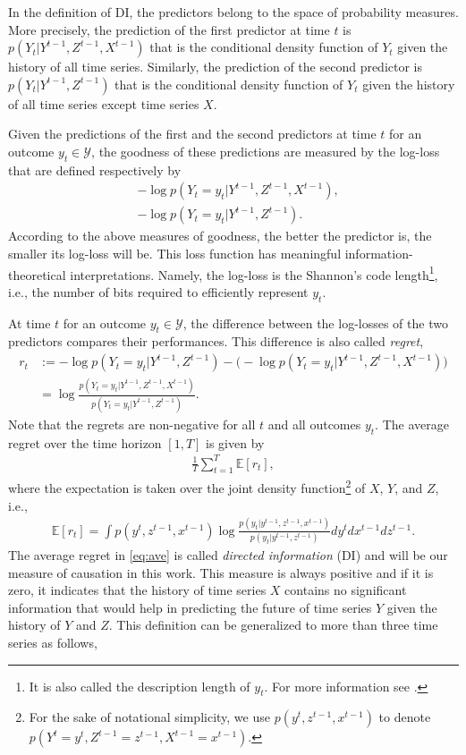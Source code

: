 In the definition of DI,  the predictors belong to the space of probability measures.  
More precisely,  
the prediction of the first predictor at time $t$ is $p(Y_t|Y^{t-1},Z^{t-1},X^{t-1})$ that is the conditional density function of $Y_t$ given the history of all time series. Similarly, the prediction of the second predictor is $p(Y_t|Y^{t-1},Z^{t-1})$ that is the conditional density function of $Y_t$ given the history of all time series except time series $X$.

Given the predictions of the first and the second predictors at time $t$ for an outcome $y_t\in \mathcal{Y}$, the goodness of these predictions are measured by the log-loss that are defined respectively by 
\begin{align*}
    &-\log p(Y_t=y_t|Y^{t-1},Z^{t-1},X^{t-1}),\\
    &-\log p(Y_t=y_t|Y^{t-1},Z^{t-1}).
\end{align*}
According to the above measures of goodness, the better the predictor is, the smaller its log-loss will be.
This loss function has meaningful information-theoretical interpretations.
Namely, the log-loss is the Shannon's code length\footnote{It is also called the description length of $y_t$. For more information see \citet{cover2012elements}.}, i.e., the number of bits required to efficiently represent $y_t$. 

At time $t$ for an outcome $y_t\in \mathcal{Y}$, the difference between the log-losses of the two predictors compares their performances.  This difference is also called \textit{regret},
\begin{align}
r_t&:=-\log{p(Y_t=y_t|Y^{t-1},Z^{t-1})}-\big(-\log {p(Y_t=y_t|Y^{t-1},Z^{t-1},X^{t-1})}\big)\\
&=\log \frac{p(Y_t=y_t|Y^{t-1},Z^{t-1},X^{t-1})}{p(Y_t=y_t|Y^{t-1},Z^{t-1})}.
\end{align}
Note that the regrets are non-negative for all $t$ and all outcomes $y_t$.
The average regret over the time horizon $[1,T]$ is given by 
\begin{align}\label{eq:ave}
   \frac{1}{T}\sum_{t=1}^T \mathbb{E}[r_t],
\end{align}
where the expectation is taken over the joint density function\footnote{For the sake of notational simplicity, we use $p(y^{t},z^{t-1},x^{t-1})$ to denote $p(Y^{t}=y^{t},Z^{t-1}=z^{t-1},X^{t-1}=x^{t-1})$.} of $X$, $Y$, and $Z$, i.e., 
\begin{align}
    \mathbb{E}[r_t]=\int p(y^{t},z^{t-1},x^{t-1})\log \frac{p(y_t|y^{t-1},z^{t-1},x^{t-1})}{p(y_t|y^{t-1},z^{t-1})}dy^tdx^{t-1}dz^{t-1}.
\end{align}
The average regret in \eqref{eq:ave} is called \textit{directed information} (DI) and will be our measure of causation in this work.
This measure is always positive and if it is zero, it indicates that the history of time series $X$ contains no significant information that would help in predicting the future of time series $Y$ given the history of $Y$ and $Z$. 
This definition can be generalized to more than three time series as follows,

